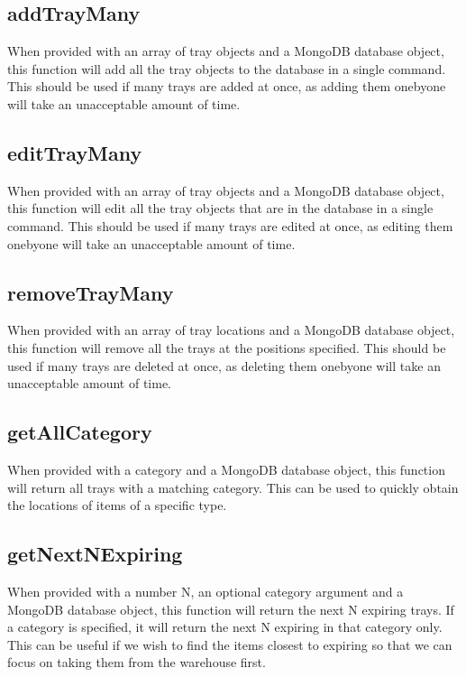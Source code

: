 \documentclass[letterpaper,10pt,english]{sphinxmanual}
\begin{document}
\subsection{addTrayMany}
\label{\detokenize{docs/Introduction/Backend_overview:addtraymany}}
When provided with an array of tray objects and a MongoDB database
object, this function will add all the tray objects to the database in a
single command. This should be used if many trays are added at once, as
adding them one\sphinxhyphen{}by\sphinxhyphen{}one will take an unacceptable amount of time.


\subsection{editTrayMany}
\label{\detokenize{docs/Introduction/Backend_overview:edittraymany}}
When provided with an array of tray objects and a MongoDB database
object, this function will edit all the tray objects that are in the
database in a single command. This should be used if many trays are
edited at once, as editing them one\sphinxhyphen{}by\sphinxhyphen{}one will take an unacceptable
amount of time.


\subsection{removeTrayMany}
\label{\detokenize{docs/Introduction/Backend_overview:removetraymany}}
When provided with an array of tray locations and a MongoDB database
object, this function will remove all the trays at the positions
specified. This should be used if many trays are deleted at once, as
deleting them one\sphinxhyphen{}by\sphinxhyphen{}one will take an unacceptable amount of time.


\subsection{getAllCategory}
\label{\detokenize{docs/Introduction/Backend_overview:getallcategory}}
When provided with a category and a MongoDB database object, this
function will return all trays with a matching category. This can be
used to quickly obtain the locations of items of a specific type.


\subsection{getNextNExpiring}
\label{\detokenize{docs/Introduction/Backend_overview:getnextnexpiring}}
When provided with a number N, an optional category argument and a
MongoDB database object, this function will return the next N expiring
trays. If a category is specified, it will return the next N expiring in
that category only. This can be useful if we wish to find the items
closest to expiring so that we can focus on taking them from the
warehouse first.
\end{document}
